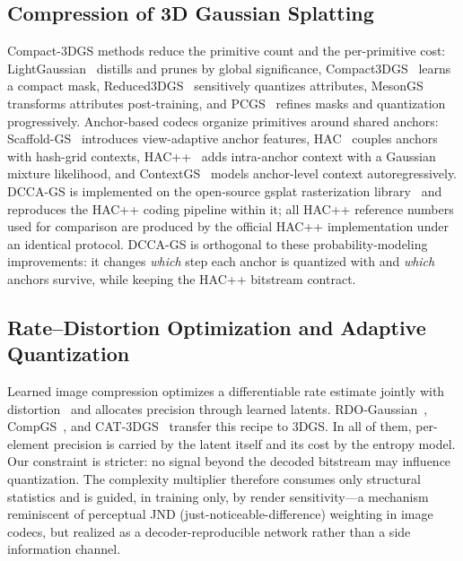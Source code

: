 \documentclass[conference]{IEEEtran}
\newcommand{\DCCA}{DCCA-GS}
\begin{document}
\subsection{Compression of 3D Gaussian Splatting}
Compact-3DGS methods reduce the primitive count and the per-primitive cost:
LightGaussian~\cite{fan2024} distills and prunes by global significance,
Compact3DGS~\cite{lee2024} learns a compact mask, Reduced3DGS~\cite{papantonakis2024}
sensitively quantizes attributes, MesonGS~\cite{xie2024} transforms attributes
post-training, and PCGS~\cite{chen2026a} refines masks and quantization
progressively. Anchor-based codecs organize primitives around shared anchors:
Scaffold-GS~\cite{lu2024} introduces view-adaptive anchor features,
HAC~\cite{chen2024} couples anchors with hash-grid contexts, HAC++~\cite{chen2025}
adds intra-anchor context with a Gaussian mixture likelihood, and
ContextGS~\cite{wang2024b} models anchor-level context autoregressively. \DCCA{} is
implemented on the open-source gsplat rasterization library~\cite{ye2024gsplat} and
reproduces the HAC++ coding pipeline within it; all HAC++ reference numbers used for
comparison are produced by the official HAC++ implementation under an identical
protocol. \DCCA{} is
orthogonal to these probability-modeling improvements: it changes \emph{which} step
each anchor is quantized with and \emph{which} anchors survive, while keeping the
HAC++ bitstream contract.

\subsection{Rate--Distortion Optimization and Adaptive Quantization}
Learned image compression optimizes a differentiable rate estimate jointly with
distortion~\cite{balle2018,cheng2020} and allocates precision through learned
latents. RDO-Gaussian~\cite{wang2024a}, CompGS~\cite{liu2024b}, and
CAT-3DGS~\cite{zhan2025} transfer this recipe to 3DGS. In all of them, per-element
precision is carried by the latent itself and its cost by the entropy model. Our
constraint is stricter: no signal beyond the decoded bitstream may influence
quantization. The complexity multiplier therefore consumes only structural
statistics and is guided, in training only, by render sensitivity---a mechanism
reminiscent of perceptual JND (just-noticeable-difference) weighting in image
codecs, but realized as a decoder-reproducible network rather than a side
information channel.
\end{document}
